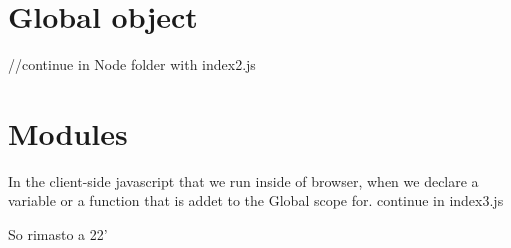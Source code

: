 \documentclass[a4paper,11pt,twoside]{article}
\begin{document}
   \section{Global object}

   //continue in Node folder with index2.js

    \section{Modules}

    In the client-side javascript that we run inside of browser, when we declare a variable or a function 
    that is addet to the Global scope for. 
    continue in index3.js


    So rimasto a 22'



    



    
\end{document}
